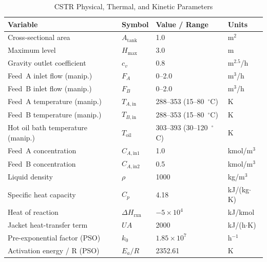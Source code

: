 \documentclass[12pt,a4paper]{article}
\begin{document}
\begin{table}[H]
  \centering
  \caption{CSTR Physical, Thermal, and Kinetic Parameters}
  \label{tab:params}
  \renewcommand{\arraystretch}{1.3}
  \begin{tabular}{@{}p{5.5cm}lll@{}}
    \toprule
    \textbf{Variable} & \textbf{Symbol} & \textbf{Value / Range} & \textbf{Units} \\
    \midrule
    Cross-sectional area              & $A_\mathrm{tank}$ & 1.0        & m$^2$ \\
    Maximum level                     & $H_\mathrm{max}$  & 3.0        & m \\
    Gravity outlet coefficient        & $c_v$             & 0.8        & m$^{2.5}$/h \\
    Feed~A inlet flow (manip.)        & $F_A$             & 0--2.0     & m$^3$/h \\
    Feed~B inlet flow (manip.)        & $F_B$             & 0--2.0     & m$^3$/h \\
    Feed~A temperature (manip.)       & $T_{A,\mathrm{in}}$ & 288--353 (15--80~$^\circ$C) & K \\
    Feed~B temperature (manip.)       & $T_{B,\mathrm{in}}$ & 288--353 (15--80~$^\circ$C) & K \\
    Hot oil bath temperature (manip.) & $T_\mathrm{oil}$ & 303--393 (30--120~$^\circ$C) & K \\
    Feed~A concentration              & $C_{A,\mathrm{in1}}$ & 1.0     & kmol/m$^3$ \\
    Feed~B concentration              & $C_{A,\mathrm{in2}}$ & 0.5     & kmol/m$^3$ \\
    Liquid density                    & $\rho$            & 1000       & kg/m$^3$ \\
    Specific heat capacity            & $C_p$             & 4.18       & kJ/(kg$\cdot$K) \\
    Heat of reaction                  & $\Delta H_\mathrm{rxn}$ & $-5\times10^4$ & kJ/kmol \\
    Jacket heat-transfer term         & $UA$              & 2000       & kJ/(h$\cdot$K) \\
    Pre-exponential factor (PSO)      & $k_0$             & $1.85\times10^7$ & h$^{-1}$ \\
    Activation energy / R (PSO)       & $E_a/R$           & 2352.61    & K \\
    \bottomrule
  \end{tabular}
\end{table}
\end{document}
